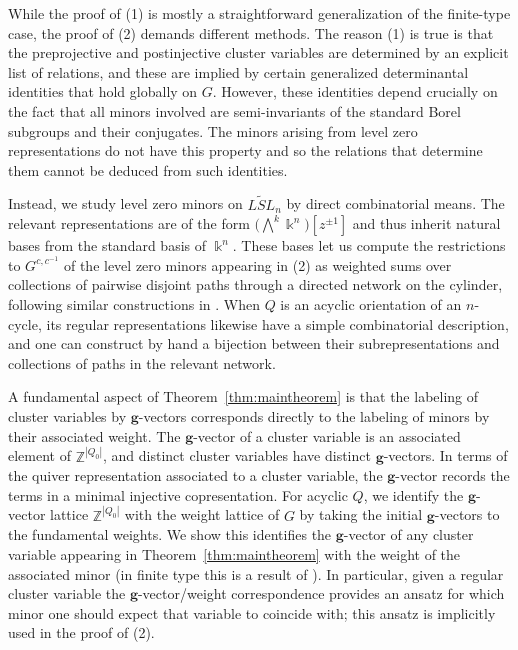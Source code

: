 \documentclass[12pt]{amsart}
\newcommand{\ZZ}{\mathbb{Z}}
\newcommand{\kk}{\Bbbk}
\newcommand{\bfg}{\mathbf{g}}
\newcommand{\loopvar}{z}
\theoremstyle{remark}
\numberwithin{equation}{section}
\numberwithin{figure}{section}
\begin{document}
While the proof of (1) is mostly a straightforward generalization of the finite-type case, the proof of (2) demands different methods.
The reason (1) is true is that the preprojective and postinjective cluster variables are determined by an explicit list of relations, and these are implied by certain generalized determinantal identities that hold globally on $G$.
However, these identities depend crucially on the fact that all minors involved are semi-invariants of the standard Borel subgroups and their conjugates.
The minors arising from level zero representations do not have this property and so the relations that determine them cannot be deduced from such identities.

Instead, we study level zero minors on $\widetilde{LSL}_n$ by direct combinatorial means.
The relevant representations are of the form $\big(\!\bigwedge^{\!k}\kk^n\big)[\loopvar^{\pm 1}]$ and thus inherit natural bases from the standard basis of $\kk^n$.
These bases let us compute the restrictions to $G^{c,c^{-1}}$ of the level zero minors appearing in (2) as weighted sums over collections of pairwise disjoint paths through a directed network on the cylinder, following similar constructions in \cite{GSV12,FM14}.
When $Q$ is an acyclic orientation of an $n$-cycle, its regular representations likewise have a simple combinatorial description, and one can construct by hand a bijection between their subrepresentations and collections of paths in the relevant network.

A fundamental aspect of Theorem~\ref{thm:maintheorem} is that the labeling of cluster variables by $\bfg$-vectors corresponds directly to the labeling of minors by their associated weight.
The $\bfg$-vector of a cluster variable is an associated element of $\ZZ^{|Q_0|}$, and distinct cluster variables have distinct $\bfg$-vectors.
In terms of the quiver representation associated to a cluster variable, the $\bfg$-vector records the terms in a minimal injective copresentation.
For acyclic $Q$, we identify the $\bfg$-vector lattice $\ZZ^{|Q_0|}$ with the weight lattice of $G$ by taking the initial $\bfg$-vectors to the fundamental weights.
We show this identifies the $\bfg$-vector of any cluster variable appearing in Theorem~\ref{thm:maintheorem} with the weight of the associated minor (in finite type this is a result of \cite{YZ08}).
In particular, given a regular cluster variable the $\bfg$-vector/weight correspondence provides an ansatz for which minor one should expect that variable to coincide with; this ansatz is implicitly used in the proof of (2).
\end{document}
